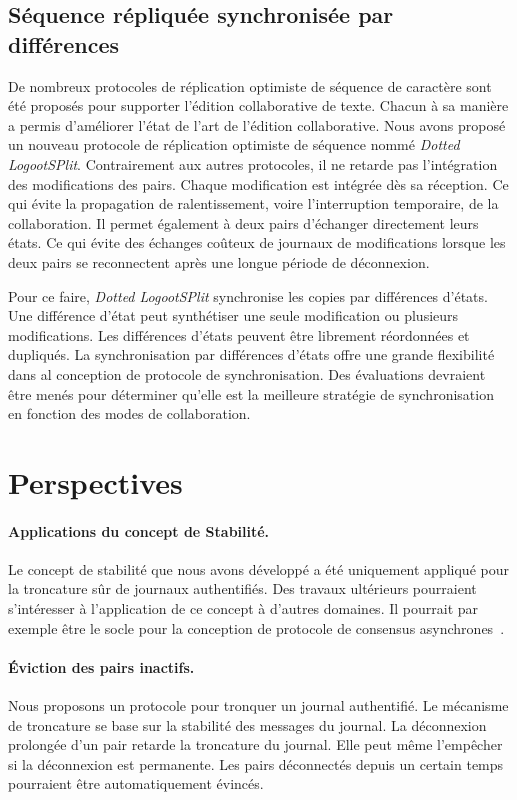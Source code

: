 \subsection{Séquence répliquée synchronisée par différences}

De nombreux protocoles de réplication optimiste de séquence de caractère sont été proposés pour supporter l'édition collaborative de texte.
Chacun à sa manière a permis d'améliorer l'état de l'art de l'édition collaborative.
Nous avons proposé un nouveau protocole de réplication optimiste de séquence nommé \emph{Dotted LogootSPlit}.
Contrairement aux autres protocoles, il ne retarde pas l'intégration des modifications des pairs.
Chaque modification est intégrée dès sa réception.
Ce qui évite la propagation de ralentissement, voire l'interruption temporaire, de la collaboration.
Il permet également à deux pairs d'échanger directement leurs états.
Ce qui évite des échanges coûteux de journaux de modifications lorsque les deux pairs se reconnectent après une longue période de déconnexion.

Pour ce faire, \emph{Dotted LogootSPlit} synchronise les copies par différences d'états.
Une différence d'état peut synthétiser une seule modification ou plusieurs modifications.
Les différences d'états peuvent être librement réordonnées et dupliqués.
La synchronisation par différences d'états offre une grande flexibilité dans al conception de protocole de synchronisation.
Des évaluations devraient être menés pour déterminer qu'elle est la meilleure stratégie de synchronisation en fonction des modes de collaboration.


\section{Perspectives}

\paragraph{Applications du concept de Stabilité.} Le concept de stabilité que nous avons développé a été uniquement appliqué pour la troncature sûr de journaux authentifiés.
Des travaux ultérieurs pourraient s'intéresser à l'application de ce concept à d'autres domaines.
Il pourrait par exemple être le socle pour la conception de protocole de consensus asynchrones~\autocite{bracha1985asynchronous}.

\paragraph{Éviction des pairs inactifs.}
Nous proposons un protocole pour tronquer un journal authentifié.
Le mécanisme de troncature se base sur la stabilité des messages du journal.
La déconnexion prolongée d'un pair retarde la troncature du journal.
Elle peut même l'empêcher si la déconnexion est permanente.
Les pairs déconnectés depuis un certain temps pourraient être automatiquement évincés.

